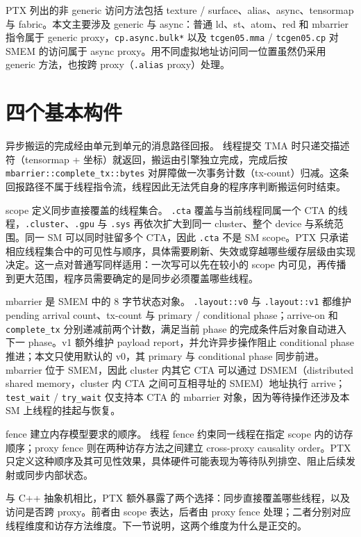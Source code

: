 PTX 列出的非 generic 访问方法包括 texture / surface、alias、async、tensormap 与 fabric。本文主要涉及 generic 与 async：普通 ld、st、atom、red 和 mbarrier 指令属于 generic proxy，\lstinline|cp.async.bulk*| 以及 \lstinline|tcgen05.mma| / \lstinline|tcgen05.cp| 对 SMEM 的访问属于 async proxy。用不同虚拟地址访问同一位置虽然仍采用 generic 方法，也按跨 proxy（\lstinline|.alias| proxy）处理。

\section{四个基本构件}

异步搬运的完成经由单元到单元的消息路径回报。 线程提交 TMA 时只递交描述符（tensormap + 坐标）就返回，搬运由引擎独立完成，完成后按 \lstinline|mbarrier::complete_tx::bytes| 对屏障做一次事务计数（tx-count）归减。这条回报路径不属于线程指令流，线程因此无法凭自身的程序序判断搬运何时结束。

scope 定义同步直接覆盖的线程集合。 \lstinline|.cta| 覆盖与当前线程同属一个 CTA 的线程，\lstinline|.cluster|、\lstinline|.gpu| 与 \lstinline|.sys| 再依次扩大到同一 cluster、整个 device 与系统范围。同一 SM 可以同时驻留多个 CTA，因此 \lstinline|.cta| 不是 SM scope。PTX 只承诺相应线程集合中的可见性与顺序，具体需要刷新、失效或穿越哪些缓存层级由实现决定。这一点对普通写同样适用：一次写可以先在较小的 scope 内可见，再传播到更大范围，程序员需要确定的是同步必须覆盖哪些线程。

mbarrier 是 SMEM 中的 8 字节状态对象。 \lstinline|.layout::v0| 与 \lstinline|.layout::v1| 都维护 pending arrival count、tx-count 与 primary / conditional phase；arrive-on 和 \lstinline|complete_tx| 分别递减前两个计数，满足当前 phase 的完成条件后对象自动进入下一 phase。v1 额外维护 payload report，并允许异步操作阻止 conditional phase 推进；本文只使用默认的 v0，其 primary 与 conditional phase 同步前进。mbarrier 位于 SMEM，因此 cluster 内其它 CTA 可以通过 DSMEM（distributed shared memory，cluster 内 CTA 之间可互相寻址的 SMEM）地址执行 arrive；\lstinline|test_wait| / \lstinline|try_wait| 仅支持本 CTA 的 mbarrier 对象，因为等待操作还涉及本 SM 上线程的挂起与恢复。

fence 建立内存模型要求的顺序。 线程 fence 约束同一线程在指定 scope 内的访存顺序；proxy fence 则在两种访存方法之间建立 cross-proxy causality order。PTX 只定义这种顺序及其可见性效果，具体硬件可能表现为等待队列排空、阻止后续发射或同步内部状态。

与 C++ 抽象机相比，PTX 额外暴露了两个选择：同步直接覆盖哪些线程，以及访问是否跨 proxy。前者由 scope 表达，后者由 proxy fence 处理；二者分别对应线程维度和访存方法维度。下一节说明，这两个维度为什么是正交的。

